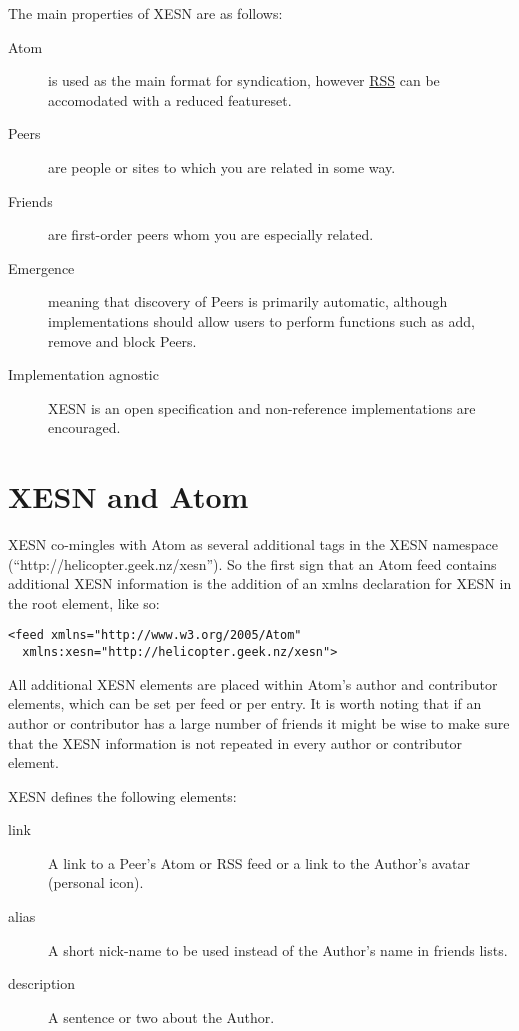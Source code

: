 \documentclass[titlepage,english,a4paper,twoside,dvips]{article}
\begin{document}
The main properties of XESN are as follows:

\begin{description}

\item[Atom] is used as the main format for syndication, however \href{http://blogs.law.harvard.edu/tech/rss}{RSS} can be accomodated with a reduced featureset.

\item[Peers] are people or sites to which you are related in some way.

\item[Friends] are first-order peers whom you are especially related.

\item[Emergence] meaning that discovery of Peers is primarily automatic, although implementations should allow users to perform functions such as add, remove and block Peers.

\item[Implementation agnostic] XESN is an open specification and non-reference implementations are encouraged.

\end{description}

\clearpage

\section{XESN and Atom}

XESN co-mingles with Atom as several additional tags in the XESN namespace (``http://helicopter.geek.nz/xesn'').  So the first sign that an Atom feed contains additional XESN information is the addition of an xmlns declaration for XESN in the root element, like so:

\begin{verbatim}
<feed xmlns="http://www.w3.org/2005/Atom" 
  xmlns:xesn="http://helicopter.geek.nz/xesn">
\end{verbatim}

All additional XESN elements are placed within Atom's author and contributor elements, which can be set per feed or per entry.  It is worth noting that if an author or contributor has a large number of friends it might be wise to make sure that the XESN information is not repeated in every author or contributor element.

XESN defines the following elements:

\begin{description}

\item[link] A link to a Peer's Atom or RSS feed or a link to the Author's avatar (personal icon).

\item[alias] A short nick-name to be used instead of the Author's name in friends lists.

\item[description] A sentence or two about the Author.

\end{description}
\end{document}
